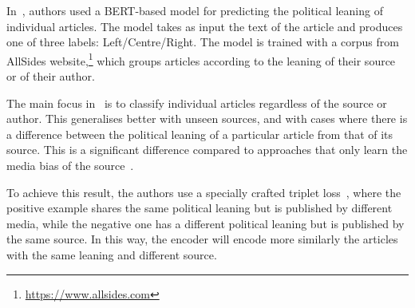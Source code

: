 

 

In~\citet{baly2020we}, authors used a BERT-based model for predicting the political leaning of individual articles. The model takes as input the text of the article and produces one of three labels: Left/Centre/Right. The model is trained with a corpus from AllSides website,\footnote{\url{https://www.allsides.com}} which groups articles %
according to the leaning of their source or of their author.


The main focus in~\citet{baly2020we} is to classify individual articles regardless of the source or author. This generalises better with unseen sources, and with cases where there is a difference between the political leaning of a particular article from that of its source.
This is a significant difference compared to approaches that only learn the media bias of the source~\citep{baly2020written,biessmann2016automating}.

To achieve this result, the authors use a specially crafted triplet loss~\citep{schroff2015facenet}, where the positive example shares the same political leaning but is published by different media, while the negative one has a different political leaning but is published by the same source. In this way, the encoder will encode more similarly the articles with the same leaning and different source.


